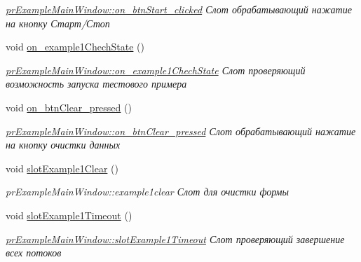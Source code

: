 \begin{DoxyCompactItemize}
\begin{DoxyCompactList}\small\item\em \hyperlink{classpr_example_main_window_a9c6a9bfaa53a655479b13d8da936c9ab}{pr\+Example\+Main\+Window\+::on\+\_\+btn\+Start\+\_\+clicked} Слот обрабатывающий нажатие на кнопку Старт/Стоп \end{DoxyCompactList}\item 
void \hyperlink{classpr_example_main_window_a60b5693aca8b86dafbcf64d9e641822f}{on\+\_\+example1\+Chech\+State} ()
\begin{DoxyCompactList}\small\item\em \hyperlink{classpr_example_main_window_a60b5693aca8b86dafbcf64d9e641822f}{pr\+Example\+Main\+Window\+::on\+\_\+example1\+Chech\+State} Слот проверяющий возможность запуска тестового примера \end{DoxyCompactList}\item 
void \hyperlink{classpr_example_main_window_a233e9d66312214a27a782870e2fd403e}{on\+\_\+btn\+Clear\+\_\+pressed} ()
\begin{DoxyCompactList}\small\item\em \hyperlink{classpr_example_main_window_a233e9d66312214a27a782870e2fd403e}{pr\+Example\+Main\+Window\+::on\+\_\+btn\+Clear\+\_\+pressed} Слот обрабатывающий нажатие на кнопку очистки данных \end{DoxyCompactList}\item 
void \hyperlink{classpr_example_main_window_abd4dfff0de439f5afc286425a0508add}{slot\+Example1\+Clear} ()
\begin{DoxyCompactList}\small\item\em pr\+Example\+Main\+Window\+::example1clear Слот для очистки формы \end{DoxyCompactList}\item 
void \hyperlink{classpr_example_main_window_a8575434cfb2b50fd78f73a8b06c43a1e}{slot\+Example1\+Timeout} ()
\begin{DoxyCompactList}\small\item\em \hyperlink{classpr_example_main_window_a8575434cfb2b50fd78f73a8b06c43a1e}{pr\+Example\+Main\+Window\+::slot\+Example1\+Timeout} Слот проверяющий завершение всех потоков \end{DoxyCompactList}\end{DoxyCompactItemize}
